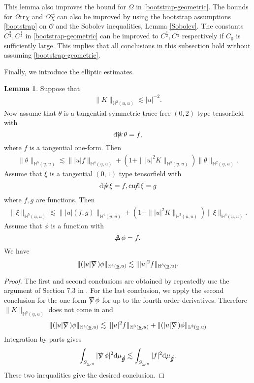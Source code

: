 \documentclass[11pt,reqno]{amsart}
\theoremstyle{definition}
\newtheorem{lemma}{Lemma}[section]
\numberwithin{equation}{section}
\newcommand{\D}{\mathrm{d}}
\newcommand{\tr}{\mathrm{tr}}
\renewcommand{\L}{\mathbb{L}}
\renewcommand{\H}{\mathbb{H}}
\def\chih{\widehat{\chi}}
\def\tr{\mathrm{tr}}
\def\ub{\underline{u}}
\def\nablas{\mbox{$\nabla \mkern -13mu /$ }}
\def\Deltas{\mbox{$\Delta \mkern -13mu /$ }}
\def\divs{\mbox{$\mathrm{div} \mkern -13mu /$ }}
\def\curls{\mbox{$\mathrm{curl} \mkern -13mu /$ }}
\def\gs{\mbox{$g \mkern -9mu /$}}
\begin{document}
This lemma also improves the bound for $\Omega$ in \eqref{bootstrap-geometric}. The bounds for $\Omega\tr\chi$ and $\Omega\chih$ can also be improved by using the bootstrap assumptions \eqref{bootstrap} on $\mathcal{O}$ and the Sobolev inequalities, Lemma \ref{Sobolev}. The constants $C^{\frac{3}{4}}, C^{\frac{1}{2}}$ in \eqref{bootstrap-geometric} can be improved to $C^{\frac{1}{2}}, C^{\frac{1}{4}}$ respectively if $C_0$ is sufficiently large. This implies that all conclusions in this subsection hold without assuming \eqref{bootstrap-geometric}.


Finally, we introduce the elliptic estimates.
\begin{lemma}\label{elliptic}
Suppose that
\begin{align*}\|K\|_{\H^2(\ub,u)}\lesssim|u|^{-2}.\end{align*}
Now assume that $\theta$ is a tangential symmetric trace-free $(0,2)$ type tensorfield with
$$\divs\theta=f,$$ where $f$ is a tangential one-form. Then
\begin{align*}
\|\theta\|_{\H^5(\ub,u)}\lesssim\||u|f\|_{\H^4(\ub,u)}+(1+\||u|^2K\|_{\H^3(\ub,u)})\|\theta\|_{\H^2(\ub,u)}.
\end{align*}
Assume that $\xi$ is a tangential $(0,1)$ type tensorfield with
\begin{align*}
\divs\xi=f,
\curls\xi=g
\end{align*} where $f,g$ are functions. Then
\begin{align*}
\|\xi\|_{\H^5(\ub,u)}\lesssim\||u|(f,g)\|_{\H^4(\ub,u)}+(1+\||u|^2K\|_{\H^3(\ub,u)})\|\xi\|_{\H^4(\ub,u)}.
\end{align*}
Assume that $\phi$ is a function with
\begin{equation*}
\Deltas\phi=f.
\end{equation*}
We have
\begin{align*}
\|(|u|\nablas)\phi\|_{\H^4(\ub,u)} \lesssim\||u|^2f\|_{\H^3(\ub,u)}.
\end{align*}
\end{lemma}
\begin{proof}
The first and second conclusions are obtained by repeatedly use the argument of Section 7.3 in \cite{Chr}. For the last conclusion, we apply the second conclusion for the one form $\nablas\phi$ for up to the fourth order derivatives. Therefore $\|K\|_{\H^3(\ub,u)}$ does not come in and
\begin{align*}
\|(|u|\nablas)\phi\|_{\H^4(\ub,u)} \lesssim\||u|^2f\|_{\H^3(\ub,u)}+\|(|u|\nablas)\phi\|_{\L^2(\ub,u)}\end{align*}
Integration by parts gives
$$\int_{S_{\ub,u}}|\nablas\phi|^2\D\mu_{\gs}\lesssim \int_{S_{\ub,u}}|f|^2\D\mu_{\gs}.$$
These two inequalities give the desired conclusion.
\end{proof}
\end{document}
